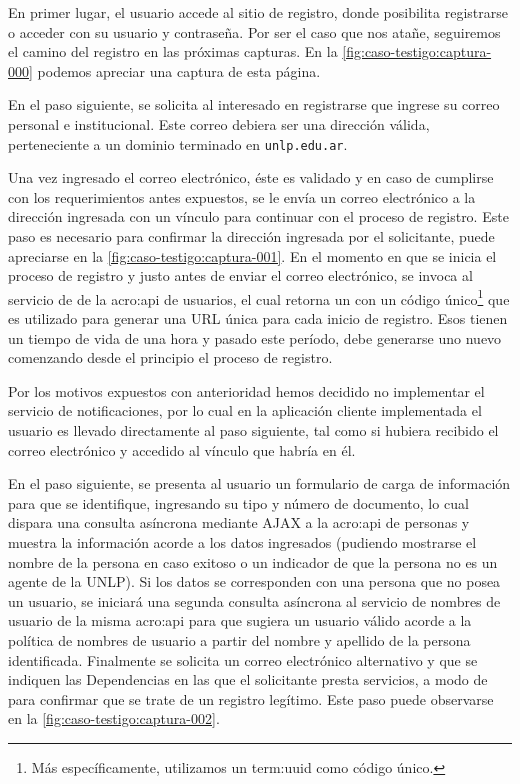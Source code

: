 En primer lugar, el usuario accede al sitio de registro, donde posibilita registrarse o acceder con su usuario y contraseña. Por ser el caso que nos atañe, seguiremos el camino del registro en las próximas capturas. En la \autoref{fig:caso-testigo:captura-000} podemos apreciar una captura de esta página.

En el paso siguiente, se solicita al interesado en registrarse que ingrese su correo personal e institucional. Este correo debiera ser una dirección válida, perteneciente a un dominio terminado en \texttt{unlp.edu.ar}.

Una vez ingresado el correo electrónico, éste es validado y en caso de cumplirse con los requerimientos antes expuestos, se le envía un correo electrónico a la dirección ingresada con un vínculo para continuar con el proceso de registro. Este paso es necesario para confirmar la dirección ingresada por el solicitante, puede apreciarse en la \autoref{fig:caso-testigo:captura-001}. En el momento en que se inicia el proceso de registro y justo antes de enviar el correo electrónico, se invoca al servicio de  de la \gls{acro:api} de usuarios, el cual retorna un  con un código único\footnote{Más específicamente, utilizamos un \gls{term:uuid} como código único.} que es utilizado para generar una URL única para cada inicio de registro. Esos  tienen un tiempo de vida de una hora y pasado este período, debe generarse uno nuevo comenzando desde el principio el proceso de registro.

Por los motivos expuestos con anterioridad hemos decidido no implementar el servicio de notificaciones, por lo cual en la aplicación cliente implementada el usuario es llevado directamente al paso siguiente, tal como si hubiera recibido el correo electrónico y accedido al vínculo que habría en él.

En el paso siguiente, se presenta al usuario un formulario de carga de información para que se identifique, ingresando su tipo y número de documento, lo cual dispara una consulta asíncrona mediante AJAX a la \gls{acro:api} de personas y muestra la información acorde a los datos ingresados (pudiendo mostrarse el nombre de la persona en caso exitoso o un indicador de que la persona no es un agente de la UNLP). Si los datos se corresponden con una persona que no posea un usuario, se iniciará una segunda consulta asíncrona al servicio de nombres de usuario de la misma \gls{acro:api} para que sugiera un usuario válido acorde a la política de nombres de usuario a partir del nombre y apellido de la persona identificada. Finalmente se solicita un correo electrónico alternativo y que se indiquen las Dependencias en las que el solicitante presta servicios, a modo de  para confirmar que se trate de un registro legítimo. Este paso puede observarse en la \autoref{fig:caso-testigo:captura-002}.

